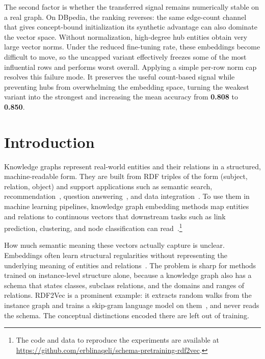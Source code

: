 \documentclass[a4paper,oneside,bibliography=totoc]{scrbook}
\begin{document}
The second factor is whether the transferred signal remains numerically stable on a real graph. On DBpedia, the ranking reverses: the same edge-count channel that gives concept-bound initialization its synthetic advantage can also dominate the vector space. Without normalization, high-degree hub entities obtain very large vector norms. Under the reduced fine-tuning rate, these embeddings become difficult to move, so the uncapped variant effectively freezes some of the most influential rows and performs worst overall. Applying a simple per-row norm cap resolves this failure mode. It preserves the useful count-based signal while preventing hubs from overwhelming the embedding space, turning the weakest variant into the strongest and increasing the mean accuracy from \textbf{0.808} to \textbf{0.850}.

\begingroup%
\hypersetup{hidelinks}%
\tableofcontents%
\endgroup



\mainmatter


\chapter{Introduction}
\label{ch:intro}

Knowledge graphs represent real-world entities and their relations in a
structured, machine-readable form. They are built from RDF triples of the form
(subject, relation, object) and support applications such as semantic search,
recommendation~\cite{wang_kgat_2019}, question answering~\cite{lan_survey_2021},
and data integration~\cite{hogan_introduction_2022}. To use them in machine
learning pipelines, knowledge graph embedding methods map entities and relations
to continuous vectors that downstream tasks such as link prediction, clustering,
and node classification can read~\cite{wang_knowledge_2017}.\footnote{The code
and data to reproduce the experiments are available at
\url{https://github.com/erblinaqeli/schema-pretraining-rdf2vec}.}

How much semantic meaning these vectors actually capture is unclear. Embeddings
often learn structural regularities without representing the underlying meaning
of entities and relations~\cite{jain2021semantics}. The problem is sharp for
methods trained on instance-level structure alone, because a knowledge graph
also has a schema that states classes, subclass relations, and the domains and
ranges of relations. RDF2Vec is a prominent example: it extracts random walks
from the instance graph and trains a skip-gram language model on
them~\cite{groth_rdf2vec_2016}, and never reads the schema. The conceptual
distinctions encoded there are left out of training.
\end{document}
